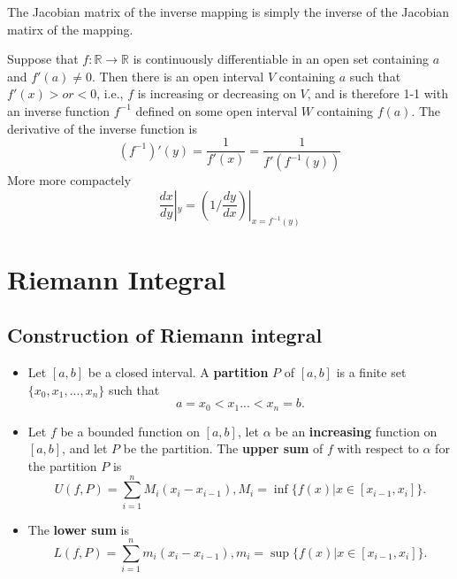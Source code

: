 \begin{refsection}
\begin{remark}\cite[119]{kaplan1973advanced}
	The Jacobian matrix of the inverse mapping is simply the inverse of the Jacobian matirx of the mapping. 
\end{remark}

\begin{corollary}\cite{spivak}
Suppose that $f:\mathbb{R} \rightarrow \mathbb{R}$ is continuously differentiable in an open set containing $a$ and $f'(a) \neq 0$. Then there is an open interval $V$ containing $a$ such that $f'(x) > or < 0$, i.e., $f$ is increasing or decreasing on $V$, and is therefore 1-1 with an inverse function $f^{-1}$ defined on some open interval $W$ containing $f(a)$. The derivative of the inverse function is\cite{spivak} $$(f^{-1})'(y)=\frac{1}{f'(x)}=\frac{1}{f'(f^{-1}(y))}$$
More more compactely
$$\frac{dx}{dy}|_y = (1/\frac{dy}{dx})|_{x = f^{-1}(y)} $$
\end{corollary}





\section{Riemann Integral}
\subsection{Construction of Riemann integral}
\begin{definition}\cite[218]{abbott2001understanding}\hfill
	\begin{itemize}
		\item Let $[a,b]$ be a closed interval. A \textbf{partition} $P$ of $[a,b]$ is a finite set $\{x_0,x_1,...,x_n\}$ such that 
		$$a=x_0 < x_1 ... < x_n =b.$$
		\item Let $f$ be a bounded function on $[a,b]$, let $\alpha$ be an \textbf{increasing} function on $[a,b]$, and let $P$ be the partition. The \textbf{upper sum} of $f$ with respect to $\alpha$ for the partition $P$ is
		$$U(f,P)=\sum_{i=1}^n M_i (x_i-x_{i-1}),M_i=\inf\{f(x)|x\in[x_{i-1},x_i]\}.$$
		\item  The \textbf{lower sum} is
		$$L(f,P)=\sum_{i=1}^n m_i (x_i-x_{i-1}),m_i=\sup\{f(x)|x\in[x_{i-1},x_i]\}.$$ 
	\end{itemize}	
\end{definition}


\end{refsection}
